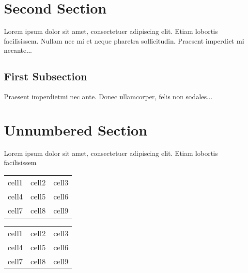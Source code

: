 \documentclass[12pt, a4paper]{article}
\begin{document}
\section{Second Section}

Lorem ipsum dolor sit amet, consectetuer adipiscing elit.  
Etiam lobortis facilisissem.  Nullam nec mi et neque pharetra 
sollicitudin.  Praesent imperdiet mi necante...

\subsection{First Subsection}
Praesent imperdietmi nec ante. Donec ullamcorper, felis non sodales...

\section*{Unnumbered Section}
Lorem ipsum dolor sit amet, consectetuer adipiscing elit.  
Etiam lobortis facilisissem




\begin{center}
\begin{tabular}{ c c c }
 cell1 & cell2 & cell3 \\ 
 cell4 & cell5 & cell6 \\  
 cell7 & cell8 & cell9    
\end{tabular}
\end{center}

\begin{center}
\begin{tabular}{ |c|c|c| } 
 \hline
 cell1 & cell2 & cell3 \\ 
 cell4 & cell5 & cell6 \\ 
 cell7 & cell8 & cell9 \\ 
 \hline
\end{tabular}
\end{center}
\end{document}
